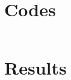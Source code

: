 \documentclass[a4paper, 11pt]{article}
\begin{document}
\section{Codes}
\lstset{language=C++}
\begin{lstlisting}

\end{lstlisting}
\section{Results}
\begin{figure}
\centering
\end{figure}


%
%
\end{document}
